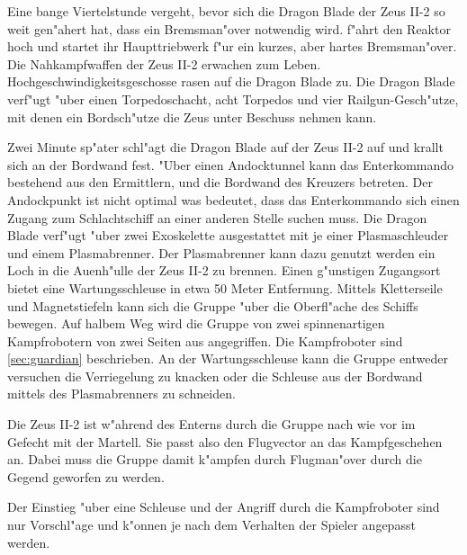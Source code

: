 Eine bange Viertelstunde vergeht, bevor sich die Dragon Blade der Zeus II-2 so weit gen"ahert hat, dass ein Bremsman"over notwendig wird. \xl{} f"ahrt den Reaktor hoch und startet ihr Haupttriebwerk f"ur ein kurzes, aber hartes Bremsman"over. Die Nahkampfwaffen der Zeus II-2 erwachen zum Leben. Hochgeschwindigkeitsgeschosse rasen auf die Dragon Blade zu. Die Dragon Blade verf"ugt "uber einen Torpedoschacht, acht Torpedos und vier Railgun-Gesch"utze, mit denen ein Bordsch"utze die Zeus unter Beschuss nehmen kann.

Zwei Minute sp"ater schl"agt die Dragon Blade auf der Zeus II-2 auf und krallt sich an der Bordwand fest. "Uber einen Andocktunnel kann das Enterkommando bestehend aus den Ermittlern, \xl{} und \ml{} die Bordwand des Kreuzers betreten. Der Andockpunkt ist nicht optimal was bedeutet, dass das Enterkommando sich einen Zugang zum Schlachtschiff an einer anderen Stelle suchen muss. Die Dragon Blade verf"ugt "uber zwei Exoskelette ausgestattet mit je einer Plasmaschleuder und einem Plasmabrenner. Der Plasmabrenner kann dazu genutzt werden ein Loch in die Au\3enh"ulle der Zeus II-2 zu brennen. Einen g"unstigen Zugangsort bietet eine Wartungsschleuse in etwa 50 Meter Entfernung. Mittels Kletterseile und Magnetstiefeln kann sich die Gruppe "uber die Oberfl"ache des Schiffs bewegen. Auf halbem Weg wird die Gruppe von zwei spinnenartigen Kampfrobotern von zwei Seiten aus angegriffen. Die Kampfroboter sind \cref{sec:guardian} beschrieben. An der Wartungsschleuse kann die Gruppe entweder versuchen die Verriegelung zu knacken oder die Schleuse aus der Bordwand mittels des Plasmabrenners zu schneiden.

\begin{remarks}
	Die Zeus II-2 ist w"ahrend des Enterns durch die Gruppe nach wie vor im Gefecht mit der Martell. Sie passt also den Flugvector an das Kampfgeschehen an. Dabei muss die Gruppe damit k"ampfen durch Flugman"over durch die Gegend geworfen zu werden.

	Der Einstieg "uber eine Schleuse und der Angriff durch die Kampfroboter sind nur Vorschl"age und k"onnen je nach dem Verhalten der Spieler angepasst werden.
\end{remarks}
